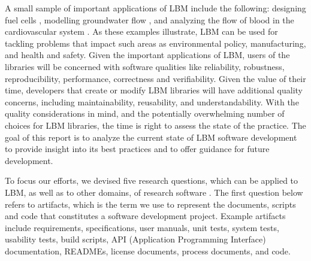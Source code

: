 \documentclass[final, 3p, times, authoryear]{elsarticle}
\begin{document}
A small sample of important applications of LBM include the following: designing
fuel cells \citep{ZhangEtAl2018}, modelling groundwater flow
\citep{AnwarAndSukop2009}, and analyzing the flow of blood in the cardiovascular
system \citep{SadeghiEtAl2020}.  As these examples illustrate, LBM can be used
for tackling problems that impact such areas as environmental policy,
manufacturing, and health and safety.  Given the important applications of LBM,
users of the libraries will be concerned with software qualities like
reliability, robustness, reproducibility, performance, correctness and
verifiability.  Given the value of their time, developers that create or modify
LBM libraries will have additional quality concerns, including maintainability,
reusability, and understandability.  With the quality considerations in mind,
and the potentially overwhelming number of choices for LBM libraries, the time
is right to assess the state of the practice.  The goal of this report is to
analyze the current state of LBM software development to provide insight into
its best practices and to offer guidance for future development.

To focus our efforts, we devised five research questions, which can be applied
to LBM, as well as to other domains, of research software \citep{SmithEtAl2021}.
The first question below refers to artifacts, which is the term we use to
represent the documents, scripts and code that constitutes a software
development project. Example artifacts include requirements, specifications,
user manuals, unit tests, system tests, usability tests, build scripts, API
(Application Programming Interface) documentation, READMEs, license documents,
process documents, and code.
\end{document}
